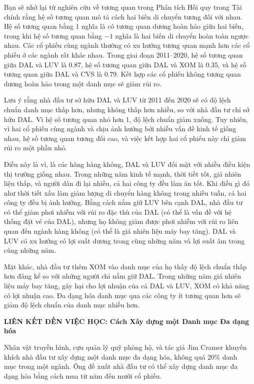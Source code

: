 Bạn sẽ nhớ lại từ nghiên cứu về tương quan trong Phân tích Hồi quy trong Tài chính rằng hệ số tương quan mô tả cách hai biến di chuyển tương đối với nhau. Hệ số tương quan bằng 1 nghĩa là có tương quan dương hoàn hảo giữa hai biến, trong khi hệ số tương quan bằng $-1$ nghĩa là hai biến di chuyển hoàn toàn ngược nhau. Các cổ phiếu cùng ngành thường có xu hướng tương quan mạnh hơn các cổ phiếu ở các ngành rất khác nhau. Trong giai đoạn 2011--2020, hệ số tương quan giữa DAL và LUV là 0.87, hệ số tương quan giữa DAL và XOM là 0.35, và hệ số tương quan giữa DAL và CVS là 0.79. Kết hợp các cổ phiếu không tương quan dương hoàn hảo trong một danh mục sẽ giảm rủi ro.

Lưu ý rằng nhà đầu tư sở hữu DAL và LUV từ 2011 đến 2020 sẽ có độ lệch chuẩn danh mục thấp hơn, nhưng không thấp hơn nhiều, so với nhà đầu tư chỉ sở hữu DAL. Vì hệ số tương quan nhỏ hơn 1, độ lệch chuẩn giảm xuống. Tuy nhiên, vì hai cổ phiếu cùng ngành và chịu ảnh hưởng bởi nhiều vấn đề kinh tế giống nhau, hệ số tương quan tương đối cao, và việc kết hợp hai cổ phiếu này chỉ giảm rủi ro một phần nhỏ.

Điều này là vì, là các hãng hàng không, DAL và LUV đối mặt với nhiều điều kiện thị trường giống nhau. Trong những năm kinh tế mạnh, thời tiết tốt, giá nhiên liệu thấp, và người dân đi lại nhiều, cả hai công ty đều làm ăn tốt. Khi điều gì đó như thời tiết xấu làm giảm lượng di chuyển hàng không trong nhiều tuần, cả hai công ty đều bị ảnh hưởng. Bằng cách nắm giữ LUV bên cạnh DAL, nhà đầu tư có thể giảm phơi nhiễm với rủi ro đặc thù của DAL (có thể là vấn đề với hệ thống đặt vé của DAL), nhưng họ không giảm được phơi nhiễm với rủi ro liên quan đến ngành hàng không (có thể là giá nhiên liệu máy bay tăng). DAL và LUV có xu hướng có lợi suất dương trong cùng những năm và lợi suất âm trong cùng những năm.

Mặt khác, nhà đầu tư thêm XOM vào danh mục của họ thấy độ lệch chuẩn thấp hơn đáng kể so với những người chỉ nắm giữ DAL. Trong những năm giá nhiên liệu máy bay tăng, gây hại cho lợi nhuận của cả DAL và LUV, XOM có khả năng có lợi nhuận cao. Đa dạng hóa danh mục qua các công ty ít tương quan hơn sẽ giảm độ lệch chuẩn của danh mục nhiều hơn.

\begin{framed}
\textbf{LIÊN KẾT ĐẾN VIỆC HỌC: Cách Xây dựng một Danh mục Đa dạng hóa}

Nhân vật truyền hình, cựu quản lý quỹ phòng hộ, và tác giả Jim Cramer khuyến khích nhà đầu tư xây dựng một danh mục đa dạng hóa, không quá 20\% danh mục trong một ngành. Ông đề xuất nhà đầu tư có thể xây dựng danh mục đa dạng hóa bằng cách mua từ năm đến mười cổ phiếu.
\end{framed}

